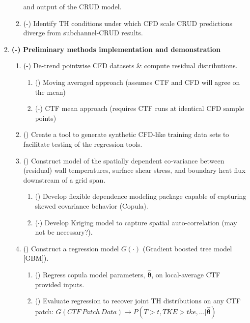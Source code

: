 \begin{enumerate}
\begin{enumerate}
              and output of the CRUD model.
          \item (\checkmark-) Identify TH conditions under which CFD scale CRUD predictions diverge from subchannel-CRUD results.
    \end{enumerate}
\item \textbf{(\checkmark-) Preliminary methods implementation and demonstration}
    \begin{enumerate}
        \item (\checkmark-) De-trend pointwise CFD datasets \& compute residual distributions.
        \begin{enumerate}
            \item (\checkmark) Moving averaged approach (assumes CTF and CFD will agree on the mean)
            \item (\checkmark-) CTF mean approach (requires CTF runs at identical CFD sample points)
        \end{enumerate}
        \item (\checkmark) Create a tool to generate synthetic CFD-like training data sets to facilitate
            testing of the regression tools.
        \item (\checkmark) Construct model of the spatially dependent co-variance between
              (residual) wall temperatures, surface shear stress, and
              boundary heat flux downstream of a grid span.
        \begin{enumerate}
            \item (\checkmark) Develop flexible dependence modeling package capable of capturing skewed covariance behavior (Copula).
            \item ($\cdot$) Develop Kriging model to capture spatial auto-correlation (may not be necessary?).
        \end{enumerate}
        \item (\checkmark) Construct a regression model $G(\cdot)$ (Gradient boosted tree model [GBM]).
        \begin{enumerate}
            \item (\checkmark) Regress copula model parameters, $\bm{\hat\theta}$, on local-average CTF provided inputs.
            \item (\checkmark) Evaluate regression to recover joint TH distributions on any CTF patch:
                $G(CTF\ Patch\ Data) \rightarrow {P(T>t,TKE>tke,...|\bm{\hat\theta})}$
        \end{enumerate}

\end{enumerate}
\end{enumerate}
